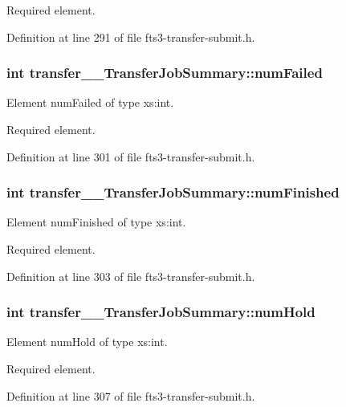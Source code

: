 Required element. 

Definition at line 291 of file fts3-\/transfer-\/submit.h.

\subsubsection[{numFailed}]{\setlength{\rightskip}{0pt plus 5cm}int {\bf transfer\_\-\_\-TransferJobSummary::numFailed}}\label{classtransfer____TransferJobSummary_ad694259cb44aa87f1518b6ffb97bff0f}


Element numFailed of type xs:int. 

Required element. 

Definition at line 301 of file fts3-\/transfer-\/submit.h.

\subsubsection[{numFinished}]{\setlength{\rightskip}{0pt plus 5cm}int {\bf transfer\_\-\_\-TransferJobSummary::numFinished}}\label{classtransfer____TransferJobSummary_ae47631ae2f0542e8339e33f6b8403d3a}


Element numFinished of type xs:int. 

Required element. 

Definition at line 303 of file fts3-\/transfer-\/submit.h.

\subsubsection[{numHold}]{\setlength{\rightskip}{0pt plus 5cm}int {\bf transfer\_\-\_\-TransferJobSummary::numHold}}\label{classtransfer____TransferJobSummary_ab840f9f2a5866827951b5540b9536907}


Element numHold of type xs:int. 

Required element. 

Definition at line 307 of file fts3-\/transfer-\/submit.h.

